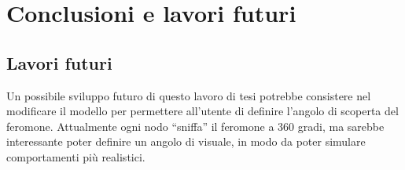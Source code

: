 \chapter{Conclusioni e lavori futuri}

\section{Lavori futuri}
Un possibile sviluppo futuro di questo lavoro di tesi potrebbe consistere nel modificare il modello per permettere all'utente di definire l'angolo di 
scoperta del feromone. Attualmente ogni nodo ``sniffa'' il feromone a 360 gradi, ma sarebbe interessante
poter definire un angolo di visuale, in modo da poter simulare comportamenti più realistici.